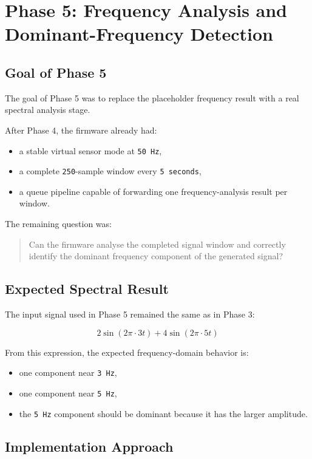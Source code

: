 \documentclass[12pt,a4paper]{article}
\begin{document}
\section{Phase 5: Frequency Analysis and Dominant-Frequency Detection}

\subsection{Goal of Phase 5}

The goal of Phase 5 was to replace the placeholder frequency result with a real
spectral analysis stage.

After Phase 4, the firmware already had:

\begin{itemize}
    \item a stable virtual sensor mode at \texttt{50 Hz},
    \item a complete \texttt{250}-sample window every \texttt{5 seconds},
    \item a queue pipeline capable of forwarding one frequency-analysis result
    per window.
\end{itemize}

The remaining question was:

\begin{quote}
Can the firmware analyse the completed signal window and correctly identify the
dominant frequency component of the generated signal?
\end{quote}

\subsection{Expected Spectral Result}

The input signal used in Phase 5 remained the same as in Phase 3:

\[
2\sin(2\pi \cdot 3t) + 4\sin(2\pi \cdot 5t)
\]

From this expression, the expected frequency-domain behavior is:

\begin{itemize}
    \item one component near \texttt{3 Hz},
    \item one component near \texttt{5 Hz},
    \item the \texttt{5 Hz} component should be dominant because it has the
    larger amplitude.
\end{itemize}

\subsection{Implementation Approach}
\end{document}
